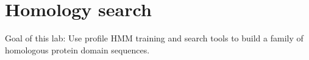 \chapter{Homology search}

Goal of this lab:
Use profile HMM training and search tools to build a family of homologous protein domain sequences.

